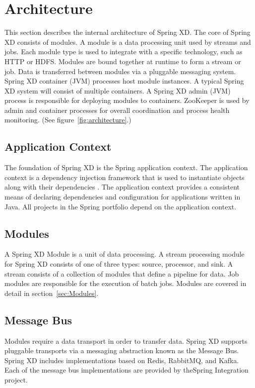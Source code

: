 \section{Architecture}
This section describes the internal architecture of Spring XD. The core of
Spring XD consists of modules. A module is a data processing unit used by
streams and jobs. Each module type is used to integrate with a specific
technology, such as HTTP or HDFS. Modules are bound together at runtime
to form a stream or job. Data is transferred between modules via a pluggable
messaging system. Spring XD container (JVM) processes host module instances.
A typical Spring XD system will consist of multiple containers. A Spring XD
admin (JVM) process is responsible for deploying modules to containers.
ZooKeeper\cite{zookeeper} is used by admin and container processes
for overall coordination and process health monitoring. 
(See figure~\ref{fig:architecture}.)

\subsection{Application Context}
The foundation of Spring XD is the Spring application context. The application
context is a dependency injection framework that is used to instantiate
objects along with their dependencies \cite{spring-framework-reference}.
The application context provides a consistent means of declaring dependencies
and configuration for applications written in Java. All projects in the
Spring\cite{spring} portfolio depend on the application context.

\subsection{Modules}
A Spring XD Module is a unit of data processing. A stream processing module
for Spring XD consists of one of three types: source, processor, and sink.
A stream consists of a collection of modules that define a pipeline for data.
Job modules are responsible for the execution of batch jobs. Modules are
covered in detail in section~\ref{sec:Modules}.

\subsection{Message Bus}
\label{subsec:MessageBus}
Modules require a data transport in order to transfer data. Spring XD
supports pluggable transports via a messaging abstraction known as 
the Message Bus. Spring XD includes implementations based on Redis\cite{redis}, 
RabbitMQ\cite{rabbitmq}, and Kafka. Each of the message bus implementations are provided 
by theSpring Integration project.

